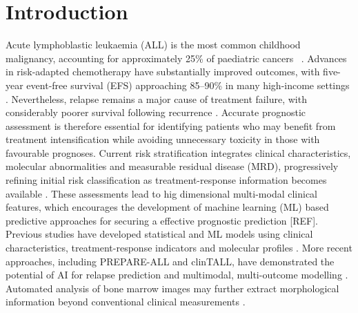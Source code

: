 \documentclass[pdflatex,sn-nature]{sn-jnl}
\begin{document}
\section{Introduction}\label{sec:intro}


Acute lymphoblastic leukaemia (ALL) is the most common childhood malignancy, accounting for approximately 25\% of paediatric cancers ~\cite{hunger2015acute}. Advances in risk-adapted chemotherapy have substantially improved outcomes, with five-year event-free survival (EFS) approaching 85–90\% in many high-income settings \cite{hunger2015acute, rheingold2024determinants}. Nevertheless, relapse remains a major cause of treatment failure, with considerably poorer survival following recurrence \cite{rheingold2024determinants}. Accurate prognostic assessment is therefore essential for identifying patients who may benefit from treatment intensification while avoiding unnecessary toxicity in those with favourable prognoses. Current risk stratification integrates clinical characteristics, molecular abnormalities and measurable residual disease (MRD), progressively refining initial risk classification as treatment-response information becomes available \cite{schultz2007risk,borowitz2008clinical}. These assessments lead to hig dimensional multi-modal clinical features, which encourages the development of machine learning (ML) based predictive approaches for securing a effective prognostic prediction [REF]. Previous studies have developed statistical and ML models using clinical characteristics, treatment-response indicators and molecular profiles \cite{Mao2020,He2022,Good2018}. More recent approaches, including PREPARE-ALL and clinTALL, have demonstrated the potential of AI for relapse prediction and multimodal, multi-outcome modelling \cite{Saravanan2026,Stoiber2026}. Automated analysis of bone marrow images may further extract morphological information beyond conventional clinical measurements \cite{Matek2021,Ghete2024}. 
\end{document}
